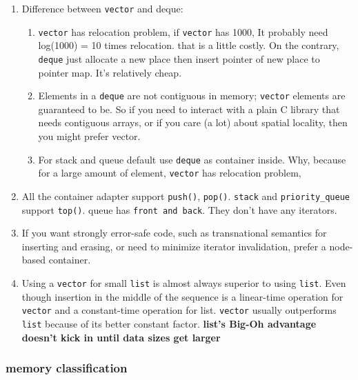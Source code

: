 \documentclass[a4paper,11pt,twoside]{book}
\begin{document}
\begin{itemize}
\begin{enumerate}
\item Difference between \texttt{vector} and deque:
\begin{enumerate}
\item \texttt{vector} has relocation problem, if \texttt{vector} has 1000, It probably need log(1000) = 10 times relocation. that is a little costly. On the contrary, \texttt{deque} just allocate a new place then insert pointer of new place to pointer map. It's relatively cheap.


\item Elements in a \texttt{deque} are not contiguous in memory; \texttt{vector} elements are guaranteed to be. So if you need to interact with a plain C library that needs contiguous arrays, or if you care (a lot) about spatial locality, then you might prefer vector.

\item For stack and queue default use \texttt{deque} as container inside. Why, because for a large amount of element, \texttt{vector} has relocation problem,
\end{enumerate}


\item All the container adapter support \texttt{push()}, \texttt{pop()}. \texttt{stack} and \texttt{priority\_queue} support \texttt{top()}. queue has \texttt{front and back}. They don't have any iterators.

\item If you want strongly error-safe code, such as transnational semantics for inserting and erasing, or need to minimize iterator invalidation, prefer a node-based container.

\item Using a \texttt{vector} for small \texttt{list} is almost always superior to using \texttt{list}. Even though insertion in the middle of the sequence is a linear-time operation for \texttt{vector} and a constant-time operation for list. \texttt{vector} usually outperforms \texttt{list} because of its better constant factor. \textbf{list's Big-Oh advantage doesn't kick in until data sizes get larger}


\end{enumerate}

\end{itemize}


\subsubsection{memory classification}
\end{document}
